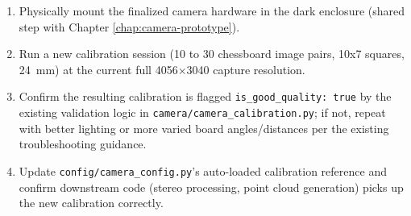 \begin{enumerate}[leftmargin=*]
    \item Physically mount the finalized camera hardware in the dark enclosure (shared step with Chapter \ref{chap:camera-prototype}).
    \item Run a new calibration session (10 to 30 chessboard image pairs, 10x7 squares, 24~mm) at the current full 4056$\times$3040 capture resolution.
    \item Confirm the resulting calibration is flagged \texttt{is\_good\_quality: true} by the existing validation logic in \texttt{camera/camera\_calibration.py}; if not, repeat with better lighting or more varied board angles/distances per the existing troubleshooting guidance.
    \item Update \texttt{config/camera\_config.py}'s auto-loaded calibration reference and confirm downstream code (stereo processing, point cloud generation) picks up the new calibration correctly.
\end{enumerate}

